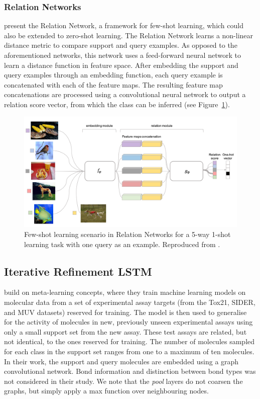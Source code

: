 \subsubsection{Relation Networks}

\citet{sung2018learning} present the Relation Network, a framework for few-shot learning, which could also be extended to zero-shot learning. The Relation Network learns a non-linear distance metric to compare support and query examples. As opposed to the aforementioned networks, this network uses a feed-forward neural network to learn a distance function in feature space. After embedding the support and query examples through an embedding function, each query example is concatenated with each of the feature maps. The resulting feature map concatenations are processed using a convolutional neural network to output a relation score vector, from which the class can be inferred (see Figure~\ref{fig:relationnets}).

\begin{figure}[h]
	\centering
	\includegraphics[width=0.9\linewidth]{img/relation-nets.png}
	\caption[Relation Networks]{Few-shot learning scenario in Relation Networks for a 5-way 1-shot learning task with one query as an example. Reproduced from \citet{sung2018learning}.}
	\label{fig:relationnets}
\end{figure}

\subsection{Iterative Refinement LSTM}

\citet{altae2017low} build on meta-learning concepts, where they train machine learning models on molecular data from a set of experimental assay targets (from the Tox21, SIDER, and MUV datasets) reserved for training. The model is then used to generalise for the activity of molecules in new, previously unseen experimental assays using only a small support set from the new assay. These test assays are related, but not identical, to the ones reserved for training. The number of molecules sampled for each class in the support set ranges from one to a maximum of ten molecules. In their work, the support and query molecules are embedded using a graph convolutional network.  Bond information and distinction between bond types was not considered in their study. We note that the \textit{pool} layers do not coarsen the graphs, but simply apply a max function over neighbouring nodes.

